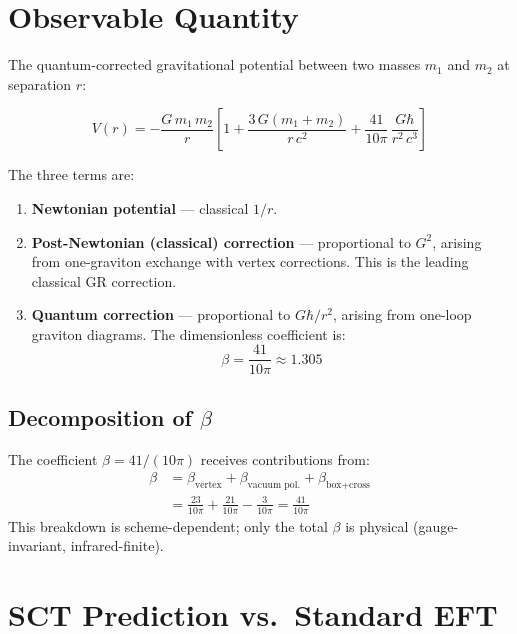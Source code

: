 \documentclass[11pt,a4paper]{article}
\begin{document}
\section{Observable Quantity}

The quantum-corrected gravitational potential between two masses $m_1$ and $m_2$ at separation $r$:

\begin{equation}
  \boxed{
    V(r) = -\frac{G\,m_1\,m_2}{r}\left[
      1
      + \frac{3\,G(m_1 + m_2)}{r\,c^2}
      + \frac{41}{10\pi}\,\frac{G\hbar}{r^2\,c^3}
    \right]
  }
  \label{eq:donoghue-potential}
\end{equation}

The three terms are:
\begin{enumerate}
  \item \textbf{Newtonian potential} --- classical $1/r$.
  \item \textbf{Post-Newtonian (classical) correction} --- proportional to $G^2$, arising from one-graviton exchange with vertex corrections. This is the leading classical GR correction.
  \item \textbf{Quantum correction} --- proportional to $G\hbar/r^2$, arising from one-loop graviton diagrams. The dimensionless coefficient is:
    \begin{equation}
      \beta = \frac{41}{10\pi} \approx 1.305
      \label{eq:beta-value}
    \end{equation}
\end{enumerate}

\subsection{Decomposition of $\beta$}

The coefficient $\beta = 41/(10\pi)$ receives contributions from:
\begin{align}
  \beta &= \beta_{\text{vertex}} + \beta_{\text{vacuum pol.}} + \beta_{\text{box+cross}} \\
  &= \frac{23}{10\pi} + \frac{21}{10\pi} - \frac{3}{10\pi} = \frac{41}{10\pi}
\end{align}
This breakdown is scheme-dependent; only the total $\beta$ is physical (gauge-invariant, infrared-finite).

\section{SCT Prediction vs.\ Standard EFT}
\end{document}
